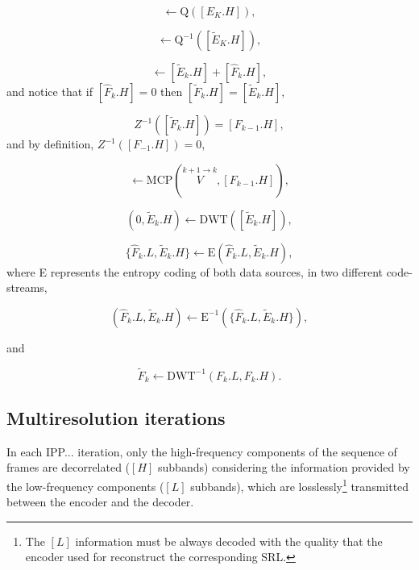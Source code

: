 \begin{equation}
  [\tilde{E}_k.H] \leftarrow \text{Q}([E_K.H]),
  \tag{j}
\end{equation}

\begin{equation}
  [\tilde{E}_k.H] \leftarrow  \text{Q}^{-1}([\tilde{E}_K.H]),
  \tag{k}
\end{equation}

\begin{equation}
  [\tilde{F}_k.H] \leftarrow [\tilde{E}_k.H] + [\hat{F}_k.H],
  \tag{l}
\end{equation}
and notice that if $[\hat{F}_k.H]=0$ then $[\tilde{F}_k.H] =
[\tilde{E}_k.H]$,

\begin{equation}
  Z^{-1}([\tilde{F}_k.H]) = [F_{k-1}.H],
  \tag{m}
\end{equation}
and by definition, $Z^{-1}([F_{-1}.H]) = 0$,

\begin{equation}
  [\hat{F}_k.H] \leftarrow \text{MCP}(\overset{k+1\rightarrow k}{V}, [F_{k-1}.H]),
  \tag{n}
\end{equation}

\begin{equation}
  (0, \tilde{E}_k.H) \leftarrow \text{DWT}([\tilde{E}_k.H]),
  \tag{o}
\end{equation}

\begin{equation}
  \{\hat{F}_k.L, \tilde{E}_k.H\} \leftarrow \text{E}(\hat{F}_k.L, \tilde{E}_k.H),
  \tag{p}
\end{equation}
where E represents the entropy coding of both data sources, in two
different code-streams,

\begin{equation}
  (\hat{F}_k.L, \tilde{E}_k.H) \leftarrow \text{E}^{-1}(\{\hat{F}_k.L, \tilde{E}_k.H\}),
  \tag{q}
\end{equation}

and

\begin{equation}
  \tilde{F}_k \leftarrow \text{DWT}^{-1}(F_k.L, F_k.H).
  \tag{r}
\end{equation}

\subsection{Multiresolution iterations}
In each IPP... iteration, only the high-frequency components of the
sequence of frames are decorrelated ($[H]$ subbands) considering the
information provided by the low-frequency components ($[L]$ subbands),
which are losslessly\footnote{The $[L]$ information must be always
decoded with the quality that the encoder used for reconstruct the
corresponding SRL.} transmitted between the encoder and the decoder.

